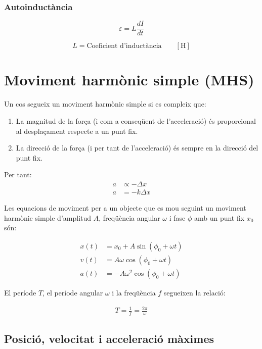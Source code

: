 \subsubsection{Autoinductància}
\label{ssub:autoinductancia}

\begin{equation}
    \varepsilon = L \frac{dI}{dt} 
\end{equation}

\begin{equation}
    L = \text{Coeficient d'inductància} \qquad \left[ \si{\henry} \right]
\end{equation}

\section{Moviment harmònic simple (MHS)}
\label{sec:moviment_harm_nic_simple}

Un cos segueix un moviment harmònic simple si es compleix que:
\begin{enumerate}
    \item La magnitud de la força (i com a conseqüent de l'acceleració)
        és proporcional al desplaçament respecte a un punt fix.
    \item La direcció de la força (i per tant de l'acceleració) és sempre en la
        direcció del punt fix.
\end{enumerate}
Per tant:
\begin{align}
    a &\propto -\Delta x\\
    a &= -k\Delta x
\end{align}

Les equacions de moviment per a un objecte que es mou seguint un moviment harmònic simple d'amplitud $A$, freqüència angular $\omega$ i fase $\phi$ amb un punt fix $x_0$són:

\begin{align}
    x(t) &= x_0 + A\sin(\phi_0+\omega t) \\
    v(t) &= A\omega\cos(\phi_0+\omega t) \\
    a(t) &= -A\omega^2\cos(\phi_0+\omega t)
\end{align}

El període $T$, el període angular $\omega$ i la freqüència $f$ segueixen la
relació:

\begin{align}
    T = \frac{1}{f} = \frac{2\pi}{\omega}
\end{align}

\subsection{Posició, velocitat i acceleració màximes}
\label{sub:posicio_velocitat_i_acceleracio_maximes}


